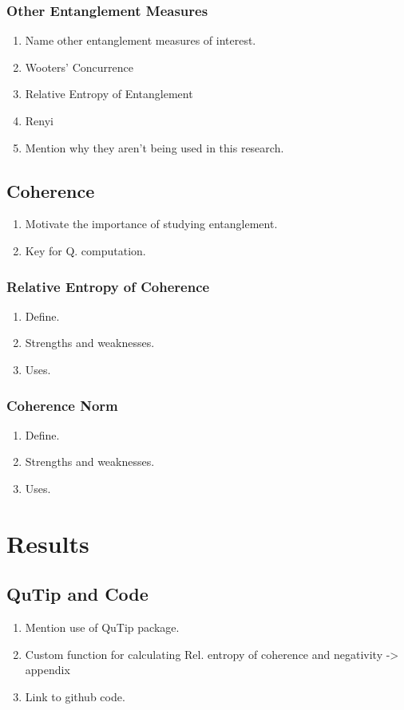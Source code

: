 \documentclass{article}
\begin{document}
\subsubsection{Other Entanglement Measures}
\begin{enumerate}
    \item Name other entanglement measures of interest.
    \item Wooters' Concurrence
    \item Relative Entropy of Entanglement 
    \item Renyi 
    \item Mention why they aren't being used in this research. 
\end{enumerate}
\subsection{Coherence}
\begin{enumerate}
    \item Motivate the importance of studying entanglement. 
    \item Key for Q. computation.
\end{enumerate}
\subsubsection{Relative Entropy of Coherence}
\begin{enumerate}
    \item Define.
    \item Strengths and weaknesses.
    \item Uses.
\end{enumerate}
\subsubsection{Coherence Norm}
\begin{enumerate}
    \item Define.
    \item Strengths and weaknesses.
    \item Uses.
\end{enumerate}

\section{Results}
\subsection{QuTip and Code}
\begin{enumerate}
    \item Mention use of QuTip package. 
    \item Custom function for calculating Rel. entropy of coherence and negativity -> appendix
    \item Link to github code.
\end{enumerate}
\end{document}

